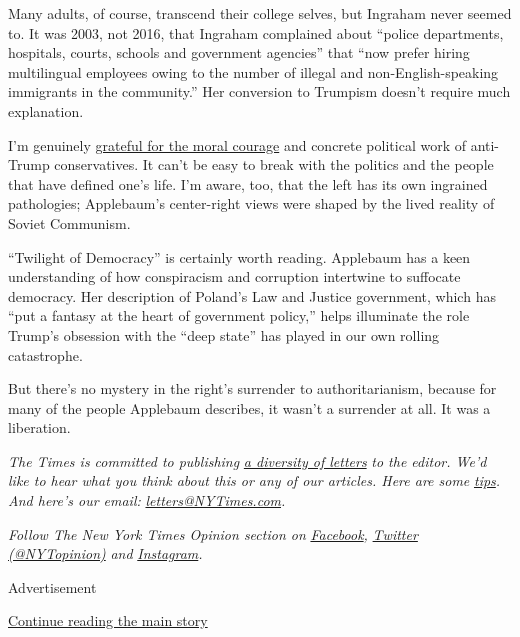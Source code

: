 Many adults, of course, transcend their college selves, but Ingraham
never seemed to. It was 2003, not 2016, that Ingraham complained about
``police departments, hospitals, courts, schools and government
agencies'' that ``now prefer hiring multilingual employees owing to the
number of illegal and non-English-speaking immigrants in the
community.'' Her conversion to Trumpism doesn't require much
explanation.

I'm genuinely
\href{https://www.nytimes3xbfgragh.onion/2019/10/28/opinion/trump-human-scum-tweet.html}{grateful
for the moral courage} and concrete political work of anti-Trump
conservatives. It can't be easy to break with the politics and the
people that have defined one's life. I'm aware, too, that the left has
its own ingrained pathologies; Applebaum's center-right views were
shaped by the lived reality of Soviet Communism.

``Twilight of Democracy'' is certainly worth reading. Applebaum has a
keen understanding of how conspiracism and corruption intertwine to
suffocate democracy. Her description of Poland's Law and Justice
government, which has ``put a fantasy at the heart of government
policy,'' helps illuminate the role Trump's obsession with the ``deep
state'' has played in our own rolling catastrophe.

But there's no mystery in the right's surrender to authoritarianism,
because for many of the people Applebaum describes, it wasn't a
surrender at all. It was a liberation.

\emph{The Times is committed to publishing}
\href{https://www.nytimes3xbfgragh.onion/2019/01/31/opinion/letters/letters-to-editor-new-york-times-women.html}{\emph{a
diversity of letters}} \emph{to the editor. We'd like to hear what you
think about this or any of our articles. Here are some}
\href{https://help.nytimes3xbfgragh.onion/hc/en-us/articles/115014925288-How-to-submit-a-letter-to-the-editor}{\emph{tips}}\emph{.
And here's our email:}
\href{mailto:letters@NYTimes.com}{\emph{letters@NYTimes.com}}\emph{.}

\emph{Follow The New York Times Opinion section on}
\href{https://www.facebookcorewwwi.onion/nytopinion}{\emph{Facebook}}\emph{,}
\href{http://twitter.com/NYTOpinion}{\emph{Twitter (@NYTopinion)}}
\emph{and}
\href{https://www.instagram.com/nytopinion/}{\emph{Instagram}}\emph{.}

Advertisement

\protect\hyperlink{after-bottom}{Continue reading the main story}

